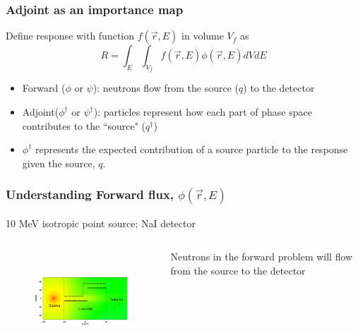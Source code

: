 \documentclass[xcolor=x11names,compress]{beamer}
\renewcommand{\(}{\begin{columns}}
\renewcommand{\)}{\end{columns}}
\newcommand{\<}[1]{\begin{column}{#1}}
\renewcommand{\>}{\end{column}}
\newcommand{\ve}[1]{\ensuremath{\vec{#1}}}
\begin{document}
\begin{frame}[fragile]
  \frametitle{Adjoint as an importance map}
Define response with function $f(\ve{r}, E)$ in volume $V_f$ as
%
\begin{equation}
 R = \int_E \int_{V_f} f(\ve{r}, E) \phi(\ve{r}, E) dV dE 
 \label{eq:Response}
\end{equation}
\pause
\begin{itemize}
\item Forward ($\phi$ or $\psi$): neutrons flow from the source ($q$) to the detector
\item Adjoint($\phi^{\dagger}$ or $\psi^{\dagger}$): particles represent how each part of phase space contributes to the ``source" ($q^{\dagger}$)
\item $\phi^{\dagger}$ represents the expected contribution of a source particle to the response given the source, $q$.
\end{itemize}


\end{frame}
\begin{frame}[fragile]

  \frametitle{Understanding Forward flux, $\phi(\vec{r},E)$}
  10 MeV isotropic point source; NaI detector
  \begin{columns}
   \begin{column}{0.75\textwidth}
   \begin{figure}
   \includegraphics[height=1.5in,clip]{../figs/maze-forward.png}
   \end{figure}
   \end{column}
  \begin{column}{0.25\textwidth}
Neutrons in the forward problem will flow from the source to the detector
   \end{column}
\end{columns}
	
\end{frame}
\end{document}
